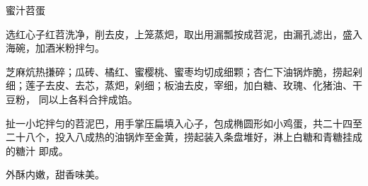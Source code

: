 %
%
%
%
%
%
%
\begin{recipe}[八宝苕蛋]{蜜汁苕蛋}

\ingredients


\preparation

\step 选红心子红苕洗净，削去皮，上笼蒸𤆵，取出用漏瓢按成苕泥，由漏孔滤出，盛入
海碗，加酒米粉拌匀。

\step 芝麻炕热搛碎；瓜砖、橘红、蜜樱桃、蜜枣均切成细颗；杏仁下油锅炸脆，捞起剁
细；莲子去皮、去芯，蒸𤆵，剁细；板油去皮，宰细，加白糖、玫瑰、化猪油、干豆粉，
同以上各料合拌成馅。

\step 扯一小坨拌匀的苕泥巴，用手掌压扁填入心子，包成椭圆形如小鸡蛋，共二十四至
二十八个，投入八成热的油锅炸至金黄，捞起装入条盘堆好，淋上白糖和青糖挂成的糖汁
即成。

\features

外酥内嫩，甜香味美。

\end{recipe}

